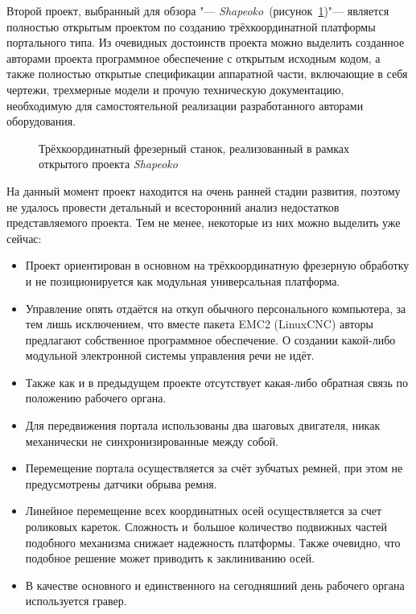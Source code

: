 Второй проект, выбранный для обзора "--- \textit{Shapeoko}~(рисунок~\cref{fig:shapeoko})"--- является полностью открытым проектом по созданию трёхкоординатной платформы портального типа. Из очевидных достоинств проекта можно выделить созданное авторами проекта программное обеспечение с открытым исходным кодом, а также полностью открытые спецификации аппаратной части, включающие в себя чертежи, трехмерные модели и прочую техническую документацию, необходимую для самостоятельной реализации разработанного авторами оборудования.

\begin{figure}[ht]
	\caption{Трёхкоординатный фрезерный станок, реализованный в рамках открытого проекта \textit{Shapeoko}}\label{fig:shapeoko}
\end{figure}

На данный момент проект находится на очень ранней стадии развития, поэтому не удалось провести детальный и всесторонний анализ недостатков представляемого проекта. Тем не менее, некоторые из них можно выделить уже сейчас:

\begin{itemize}
	\item Проект ориентирован в основном на трёхкоординатную фрезерную обработку и не позиционируется как модульная универсальная платформа.
	\item Управление опять отдаётся на откуп обычного персонального компьютера, за тем лишь исключением, что вместе пакета EMC2 (LinuxCNC) авторы предлагают собственное программное обеспечение. О создании какой-либо модульной электронной системы управления речи не идёт.
	\item Также как и в предыдущем проекте отсутствует какая-либо обратная связь по положению рабочего органа.
	\item Для передвижения портала использованы два шаговых двигателя, никак механически не синхронизированные между собой.
	\item Перемещение портала осуществляется за счёт зубчатых ремней, при этом не предусмотрены датчики обрыва ремня.
	\item Линейное перемещение всех координатных осей осуществляется за счет роликовых кареток. Сложность и~большое количество подвижных частей подобного механизма снижает надежность платформы. Также очевидно, что подобное решение может приводить к заклиниванию осей.
	\item В качестве основного и единственного на сегодняшний день рабочего органа используется гравер.
\end{itemize}

